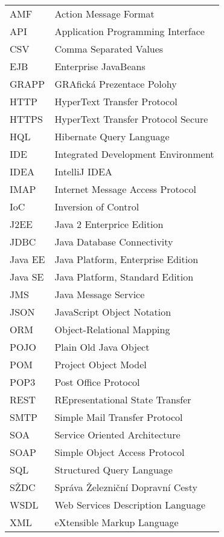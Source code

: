 
\seznamzkr

\begin{tabular}{ll}
  AMF		& Action Message Format					\\
  API		& Application Programming Interface		\\
  CSV		& Comma Separated Values				\\
  EJB		& Enterprise JavaBeans					\\
  GRAPP		& GRAfická Prezentace Polohy			\\
  HTTP		& HyperText Transfer Protocol			\\
  HTTPS		& HyperText Transfer Protocol Secure	\\
  HQL		& Hibernate Query Language				\\
  IDE		& Integrated Development Environment	\\
  IDEA		& IntelliJ IDEA							\\
  IMAP		& Internet Message Access Protocol		\\
  IoC		& Inversion of Control					\\
  J2EE		& Java 2 Enterprice Edition				\\
  JDBC		& Java Database Connectivity			\\
  Java EE	& Java Platform, Enterprise Edition		\\
  Java SE	& Java Platform, Standard Edition		\\
  JMS		& Java Message Service					\\
  JSON		& JavaScript Object Notation			\\
  ORM		& Object-Relational Mapping				\\
  POJO		& Plain Old Java Object					\\
  POM		& Project Object Model					\\
  POP3		& Post Office Protocol					\\
  REST		& REpresentational State Transfer		\\
  SMTP		& Simple Mail Transfer Protocol			\\
  SOA		& Service Oriented Architecture			\\
  SOAP		& Simple Object Access Protocol 		\\
  SQL		& Structured Query Language		 		\\
  SŽDC		& Správa Železniční Dopravní Cesty 		\\
  WSDL		& Web Services Description Language		\\
  XML		& eXtensible Markup Language			\\
\end{tabular}

